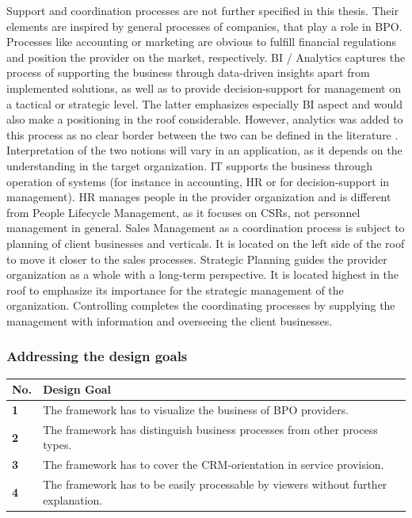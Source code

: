 	 Support and coordination processes are not further specified in this thesis. Their elements are inspired by general processes of companies, that play a role in \acrshort{BPO}. Processes like accounting or marketing are obvious to fulfill financial regulations and position the provider on the market, respectively. \acrfull{BI} / Analytics captures the process of supporting the business through data-driven insights apart from implemented solutions, as well as to provide decision-support for management on a tactical or strategic level. The latter emphasizes especially  \acrshort{BI} aspect and would also make a positioning in the roof considerable. However, analytics was added to this process as no clear border between the two can be defined in the literature \citep{mertens}. Interpretation of the two notions will vary in an application, as it depends on the understanding in the target organization. IT supports the business through operation of systems (for instance in accounting, HR or for decision-support in management). HR manages people in the provider organization and is different from People Lifecycle Management, as it focuses on \acrshort{CSR}s, not personnel management in general. Sales Management as a coordination process is subject to planning of client businesses and verticals. It is located on the left side of the roof to move it closer to the sales processes. Strategic Planning guides the provider organization as a whole with a long-term perspective. It is located highest in the roof to emphasize its importance for the strategic management of the organization. Controlling completes the coordinating processes by supplying the management with information and overseeing the client businesses. 
	 	 
	 \subsubsection{Addressing  the design goals}
	 
	 	 	\begin{table}[caption={Design Goals}, label={tab:desobj}]
	 	\centering
	 	\begin{tabular}{l p{13.3cm}}
	 		
	 		\textbf{No. }&\textbf{ Design Goal}
	 		\\ \hline
	 		\textbf{1 }                        & The framework has to visualize the business of BPO providers.                                     \\ \hline
	 		\textbf{2}                         & The framework has distinguish business processes from other process types.                                                                                                                   \\ \hline
	 		\textbf{3 }                        & The framework has to cover the CRM-orientation in service provision. \\ \hline
	 		\textbf{4}                         & The framework has to be easily processable by viewers without further explanation.                                                              
	 		
	 	\end{tabular}
	 \end{table}
 
